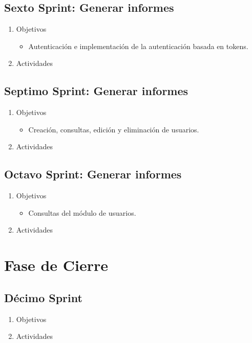         
    \subsection{Sexto Sprint: Generar informes}
    \begin{enumerate}
        \item Objetivos
        \begin{itemize}
            \item Autenticación e implementación de la autenticación basada en tokens.
        \end{itemize}
        \item Actividades
    \end{enumerate}
        
        
    \subsection{Septimo Sprint: Generar informes}
    \begin{enumerate}
        \item Objetivos
        \begin{itemize}
            \item Creación, consultas, edición y eliminación de usuarios.
        \end{itemize}
        \item Actividades
    \end{enumerate}
        
        
    \subsection{Octavo Sprint: Generar informes}
    \begin{enumerate}
        \item Objetivos
        \begin{itemize}
            \item Consultas del módulo de usuarios.
        \end{itemize}
        \item Actividades
    \end{enumerate}
        
    
\section{Fase de Cierre}
    \subsection{Décimo Sprint}
    \begin{enumerate}
        \item Objetivos
        \item Actividades
    \end{enumerate}
        
